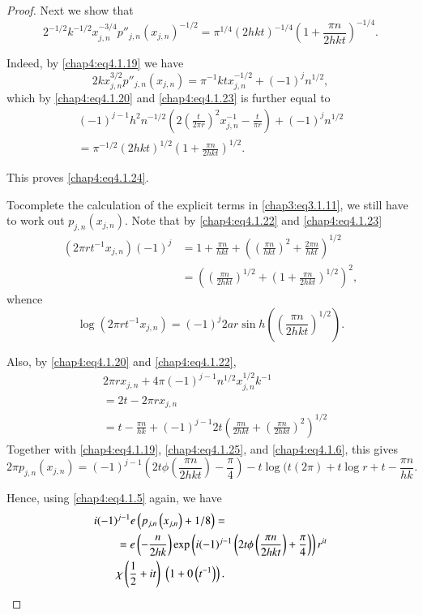 \begin{proof}
Next we show that 
\begin{equation}\label{chap4:eq4.1.24}
2^{-1/2}k^{-1/2}x_{j,n}^{-3/4}p''_{j,n}\left(x_{j,n}\right)^{-1/2}=
\pi^{1/4}(2hkt)^{-1/4}\left(1+\frac{\pi n}{2hkt}\right)^{-1/4}.
\end{equation}

Indeed, by \eqref{chap4:eq4.1.19} we have 
$$
2kx_{j,n}^{3/2}p''_{j,n}\left(x_{j,n}\right)=\pi^{-1}ktx_{j,n}^{-1/2}
+(-1)^jn^{1/2},
$$
which by \eqref{chap4:eq4.1.20} and \eqref{chap4:eq4.1.23} is further
equal to 
\begin{gather*}
(-1)^{j-1}h^2n^{-1/2}\left(2\left(\frac{t}{2\pi r}\right)^2
x_{j,n}^{-1}-\frac{t}{\pi r}\right)+(-1)^jn^{1/2}\\
=\pi^{-1/2}(2hkt)^{1/2}\left(1+\frac{\pi n}{2hkt}\right)^{1/2}.
\end{gather*}

This proves \eqref{chap4:eq4.1.24}.

To\pageoriginale complete the calculation of the explicit terms in
\eqref{chap3:eq3.1.11}, we still have to work out
$p_{j,n}(x_{j,n})$. Note that by \eqref{chap4:eq4.1.22} and
\eqref{chap4:eq4.1.23} 
\begin{align*}
\left(2\pi rt^{-1}x_{j,n}\right)(-1)^j &= 1+\frac{\pi n}{hkt}+
\left(\left(\frac{\pi n}{hkt}\right)^2+\frac{2\pi n}{hkt}
\right)^{1/2}\\
&= \left(\left(\frac{\pi n}{2hkt}\right)^{1/2}+\left(1+\frac{\pi n}
{2hkt}\right)^{1/2}\right)^2,
\end{align*}
whence
\begin{equation}\label{chap4:eq4.1.25}
\log\left(2\pi rt^{-1}x_{j,n}\right)=(-1)^j 2 ar\sin h \left(\left(
\frac{\pi n}{2hkt}\right)^{1/2}\right).
\end{equation}

Also, by \eqref{chap4:eq4.1.20} and \eqref{chap4:eq4.1.22},
\begin{align*}
&2\pi rx_{j,n}+4\pi(-1)^{j-1}n^{1/2}x_{j,n}^{1/2}k^{-1}\\
&= 2t-2\pi rx_{j,n}\\
&= t-\frac{\pi n}{hk}+(-1)^{j-1}2t\left(\frac{\pi n}{2hkt}+\left(
\frac{\pi n}{2hkt}\right)^2\right)^{1/2}
\end{align*}
Together with \eqref{chap4:eq4.1.19}, \eqref{chap4:eq4.1.25}, and
\eqref{chap4:eq4.1.6}, this gives
$$
2\pi p_{j,n}\left(x_{j,n}\right)=(-1)^{j-1}\left(2t\phi\left(
\frac{\pi n}{2hkt}\right)-\frac{\pi}{4}\right)-t\log (t(2\pi)+t\log
r+t-\frac{\pi n}{hk}.
$$

Hence, using \eqref{chap4:eq4.1.5} again, we have
\begin{align}
&i(-1)^{j-1}e\left(p_{j,n}\left(x_{j,n}\right)+1/8\right)
=\label{chap4:eq4.1.26}\\
&\qquad =e\left(-\frac{n}{2hk}\right)\exp\left(i(-1)^{j-1}\left(2t\phi \left(
\frac{\pi n}{2hkt}\right)+\frac{\pi}{4}\right)\right)r^{it}\notag\\
& \qquad \chi\left(\frac{1}{2}+it\right)\;\left(1+0\left(t^{-1}\right)
\right).\notag 
\end{align}


\end{proof}
